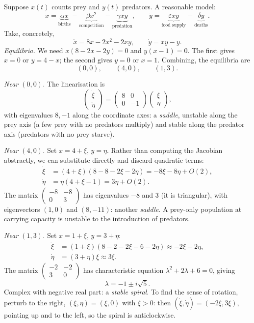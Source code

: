 \documentclass[a4paper]{scrartcl}
\begin{document}
\begin{example}
	Suppose $x(t)$ counts prey and $y(t)$ predators. A reasonable model:
	$$
	\dot x = \underbrace{\alpha x}_{\text{births}} - \underbrace{\beta x^2}_{\text{competition}} - \underbrace{\gamma xy}_{\text{predation}}, \qquad
	\dot y = \underbrace{\varepsilon xy}_{\text{food supply}} - \underbrace{\delta y}_{\text{deaths}}.
	$$
	Take, concretely,
	$$
	\dot x = 8x - 2x^2 - 2xy, \qquad \dot y = xy - y.
	$$
	\emph{Equilibria.} We need $x(8 - 2x - 2y) = 0$ and $y(x - 1) = 0$. The first gives $x = 0$ or $y = 4 - x$; the second gives $y = 0$ or $x = 1$. Combining, the equilibria are
	$$
	(0, 0), \qquad (4, 0), \qquad (1, 3).
	$$

	\emph{Near $(0,0)$.} The linearisation is
	$$
	\begin{pmatrix} \dot\xi \\ \dot\eta \end{pmatrix} = \begin{pmatrix} 8 & 0 \\ 0 & -1 \end{pmatrix}\begin{pmatrix} \xi \\ \eta\end{pmatrix},
	$$
	with eigenvalues $8, -1$ along the coordinate axes: a \emph{saddle}, unstable along the prey axis (a few prey with no predators multiply) and stable along the predator axis (predators with no prey starve).

	\emph{Near $(4, 0)$.} Set $x = 4 + \xi$, $y = \eta$. Rather than computing the Jacobian abstractly, we can substitute directly and discard quadratic terms:
	\begin{align*}
		\dot \xi &= (4 + \xi)(8 - 8 - 2\xi - 2\eta) = -8\xi - 8\eta + O(2), \\
		\dot \eta &= \eta(4 + \xi - 1) = 3\eta + O(2).
	\end{align*}
	The matrix $\begin{pmatrix} -8 & -8 \\ 0 & 3 \end{pmatrix}$ has eigenvalues $-8$ and $3$ (it is triangular), with eigenvectors $(1, 0)$ and $(8, -11)$: another \emph{saddle}. A prey-only population at carrying capacity is unstable to the introduction of predators.

	\emph{Near $(1, 3)$.} Set $x = 1 + \xi$, $y = 3 + \eta$:
	\begin{align*}
		\dot\xi &= (1 + \xi)(8 - 2 - 2\xi - 6 - 2\eta) \approx -2\xi - 2\eta, \\
		\dot\eta &= (3 + \eta)\xi \approx 3\xi.
	\end{align*}
	The matrix $\begin{pmatrix} -2 & -2 \\ 3 & 0\end{pmatrix}$ has characteristic equation $\lambda^2 + 2\lambda + 6 = 0$, giving
	$$
	\lambda = -1 \pm i \sqrt 5.
	$$
	Complex with negative real part: a \emph{stable spiral}. To find the sense of rotation, perturb to the right, $(\xi, \eta) = (\xi, 0)$ with $\xi > 0$: then $(\dot \xi, \dot\eta) = (-2\xi, 3\xi)$, pointing up and to the left, so the spiral is anticlockwise.


\end{example}
\end{document}
